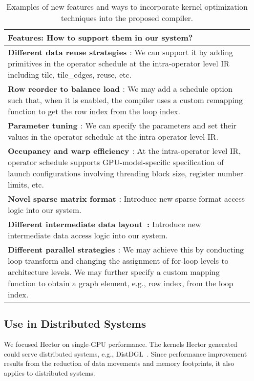 \begin{table}[]
\centering
\begin{tabular}{p{13cm}}
\toprule
\textbf{Features}: How to support them in our system?    \\\midrule
\textbf{Different data reuse strategies \cite{yesilDenseDynamicBlocks2022}}: We can support it by adding primitives in the operator schedule at the intra-operator level IR including tile, tile\_edges, reuse, etc.                                               \\
\textbf{Row reorder to balance load \cite{hegdeExTensorAcceleratorSparse2019}}: We may add a schedule option such that, when it is enabled, the compiler uses a custom remapping function to get the row index from the loop index.                   \\
\textbf{Parameter tuning \cite{vuducAutomaticPerformanceTuning2003}}: We can specify the parameters and set their values in the operator schedule at the intra-operator level IR.                                                                           \\
\textbf{Occupancy and warp efficiency \cite{yangDesignPrinciplesSparse2018}}: At the intra-operator level IR, operator schedule supports GPU-model-specific specification of launch configurations involving threading block size, register number limits, etc. \\
\textbf{Novel sparse matrix format \cite{liuCSR5EfficientStorage2015,yanYaSpMVAnotherSpMV2014}}: Introduce new sparse format access logic into our system.\\
\textbf{Different intermediate data layout~\cite{STRZODKA2012429, HOMANN2018325}:} Introduce new intermediate data access logic into our system. \\
\textbf{Different parallel strategies \cite{yangDesignPrinciplesSparse2018}}: We may achieve this by conducting loop transform and changing the assignment of for-loop levels to architecture levels. We may further specify a custom mapping function to obtain a graph element, e.g., row index, from the loop index. \\\bottomrule              
\end{tabular}
\caption{Examples of new features and ways to incorporate kernel optimization techniques into the proposed compiler.}\label{tab:feature_examples}
\end{table}

\subsection{Use in Distributed Systems}
We focused Hector on single-GPU performance. The kernels Hector generated could serve distributed systems, e.g., DistDGL~\cite{zhengDistDGLDistributedGraph2020}. Since performance improvement results from the reduction of data movements and memory footprints, it also applies to distributed systems.



